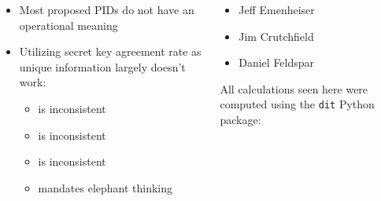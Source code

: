 \documentclass[final,serif,aspectratio=1610]{beamer}
\begin{document}
\begin{frame}
  \begin{columns}
    \begin{column}{0.6\textwidth}
      \begin{tcolorbox}[title=Summary]
        \setlength{\leftmargini}{0.1cm}
        \setlength{\leftmarginii}{0.25cm}
        \large
        \begin{itemize}
          \item Most proposed PIDs do not have an operational meaning
          \item Utilizing secret key agreement rate as unique information largely doesn't work:
          \begin{itemize}
            \item {} is inconsistent
            \item {} is inconsistent
            \item {} is inconsistent
            \item {} mandates elephant thinking
          \end{itemize}
        \end{itemize}
      \end{tcolorbox}
    \end{column}
    \begin{column}{0.4\textwidth}
      \begin{tcolorbox}[title=Collaborators]
        \setlength{\leftmargini}{0.25cm}
        \begin{itemize}
          \item Jeff Emenheiser
          \item Jim Crutchfield
          \item Daniel Feldspar
        \end{itemize}
      \end{tcolorbox}
      \vspace{0.11cm}
      \begin{tcolorbox}[title=Calculations]
        All calculations seen here were computed using the \texttt{dit} Python package:

        \vspace{0.25cm}
        \footnotesize
      \end{tcolorbox}
    \end{column}
  \end{columns}
\end{frame}
\end{document}
